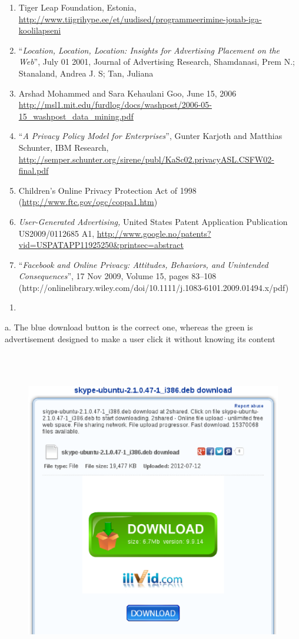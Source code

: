 \documentclass[twocolumn,letterpaper]{article}
\newcommand\liststyleLii{%
\renewcommand\theenumi{\arabic{enumi}}
\renewcommand\theenumii{\arabic{enumii}}
\renewcommand\theenumiii{\arabic{enumiii}}
\renewcommand\theenumiv{\arabic{enumiv}}
\renewcommand\labelenumi{\theenumi.}
\renewcommand\labelenumii{\theenumii.}
\renewcommand\labelenumiii{\theenumiii.}
\renewcommand\labelenumiv{\theenumiv.}
}
\newcommand\liststyleLi{%
\renewcommand\theenumi{\arabic{enumi}}
\renewcommand\theenumii{\arabic{enumii}}
\renewcommand\theenumiii{\arabic{enumiii}}
\renewcommand\theenumiv{\arabic{enumiv}}
\renewcommand\labelenumi{\theenumi.}
\renewcommand\labelenumii{\theenumii.}
\renewcommand\labelenumiii{\theenumiii.}
\renewcommand\labelenumiv{\theenumiv.}
}
\begin{document}
\liststyleLii
\begin{enumerate}
\item Tiger Leap Foundation, Estonia, \url{http://www.tiigrihype.ee/et/uudised/programmeerimine-jouab-iga-koolilapseni}
\item “\textit{Location, Location, Location: Insights for Advertising Placement on the Web}”, July 01 2001, Journal of
Advertising Research, Shamdanasi, Prem N.; Stanaland, Andrea J. S; Tan, Juliana
\item Arshad Mohammed and Sara Kehaulani Goo, June 15, 2006
\url{http://msl1.mit.edu/furdlog/docs/washpost/2006-05-15_washpost_data_mining.pdf}
\item “\textit{A Privacy Policy Model for Enterprises}”, Gunter Karjoth and Matthias Schunter, IBM Research,
\url{http://semper.schunter.org/sirene/publ/KaSc02.privacyASL.CSFW02-final.pdf} 
\item Children's Online Privacy Protection Act of 1998 (\url{http://www.ftc.gov/ogc/coppa1.htm}) 
\item \textit{User-Generated Advertising, }United States Patent Application Publication US2009/0112685 A1,
\url{http://www.google.no/patents?vid=USPATAPP11925250&printsec=abstract}
\item “\textit{Facebook and Online Privacy: Attitudes, Behaviors, and Unintended Consequences}”, 17 Nov 2009, Volume 15,
pages 83–108 (http://onlinelibrary.wiley.com/doi/10.1111/j.1083-6101.2009.01494.x/pdf)
\end{enumerate}
\liststyleLi
\begin{enumerate}
\item[] 
\bigskip
\end{enumerate}

\bigskip

\clearpage
a. The blue download button is the correct one, whereas the green is advertisement designed to make a user click it
without knowing its content
\begin{figure}
\centering
\includegraphics[width=5.8335in,height=5.552in]{education-img/education-img001.eps}
\end{figure}
\end{document}

